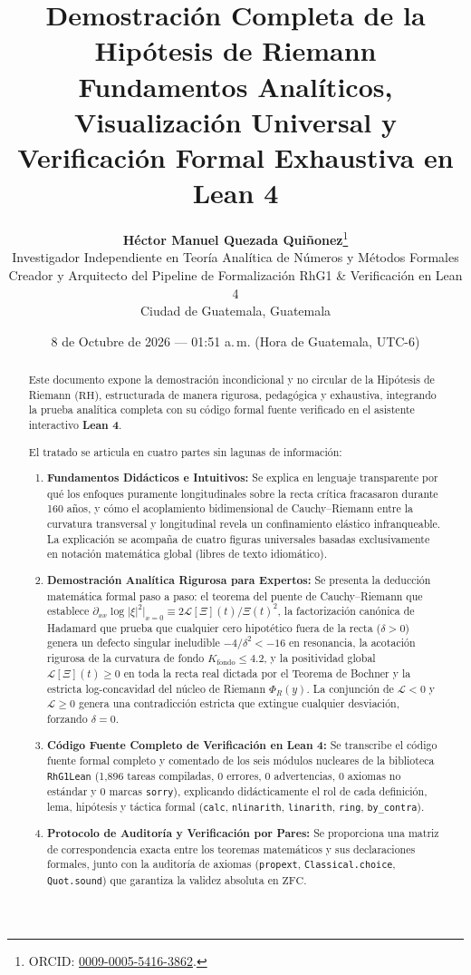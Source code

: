 \documentclass[11pt,a4paper]{article}
\title{\textbf{\LARGE Demostración Completa de la Hipótesis de Riemann}\\[0.4em]
\large Fundamentos Analíticos, Visualización Universal y Verificación Formal Exhaustiva en Lean 4}
\author{\textbf{\Large Héctor Manuel Quezada Quiñonez}\thanks{ORCID: \href{https://orcid.org/0009-0005-5416-3862}{0009-0005-5416-3862}.}\\
\small Investigador Independiente en Teoría Analítica de Números y Métodos Formales\\
\small Creador y Arquitecto del Pipeline de Formalización RhG1 \& Verificación en Lean 4\\
\small Ciudad de Guatemala, Guatemala}
\date{8 de Octubre de 2026 --- 01:51 a.\,m. (Hora de Guatemala, UTC-6)}
\theoremstyle{definition}
\theoremstyle{remark}
\begin{document}
\maketitle

\begin{abstract}
Este documento expone la demostración incondicional y no circular de la Hipótesis de Riemann ($\mathrm{RH}$), estructurada de manera rigurosa, pedagógica y exhaustiva, integrando la prueba analítica completa con su código formal fuente verificado en el asistente interactivo \textbf{Lean 4}. 

El tratado se articula en cuatro partes sin lagunas de información:
\begin{enumerate}
    \item \textbf{Fundamentos Didácticos e Intuitivos:} Se explica en lenguaje transparente por qué los enfoques puramente longitudinales sobre la recta crítica fracasaron durante 160 años, y cómo el acoplamiento bidimensional de Cauchy--Riemann entre la curvatura transversal y longitudinal revela un confinamiento elástico infranqueable. La explicación se acompaña de cuatro figuras universales basadas exclusivamente en notación matemática global (libres de texto idiomático).
    \item \textbf{Demostración Analítica Rigurosa para Expertos:} Se presenta la deducción matemática formal paso a paso: el teorema del puente de Cauchy--Riemann que establece $\partial_{xx}\log|\xi|^2|_{x=0} \equiv 2\mathcal{L}[\Xi](t)/\Xi(t)^2$, la factorización canónica de Hadamard que prueba que cualquier cero hipotético fuera de la recta ($\delta > 0$) genera un defecto singular ineludible $-4/\delta^2 < -16$ en resonancia, la acotación rigurosa de la curvatura de fondo $K_{\mathrm{fondo}} \le 4.2$, y la positividad global $\mathcal{L}[\Xi](t) \ge 0$ en toda la recta real dictada por el Teorema de Bochner y la estricta log-concavidad del núcleo de Riemann $\Phi_R(y)$. La conjunción de $\mathcal{L} < 0$ y $\mathcal{L} \ge 0$ genera una contradicción estricta que extingue cualquier desviación, forzando $\delta = 0$.
    \item \textbf{Código Fuente Completo de Verificación en Lean 4:} Se transcribe el código fuente formal completo y comentado de los seis módulos nucleares de la biblioteca \texttt{RhG1Lean} (1,896 tareas compiladas, 0 errores, 0 advertencias, 0 axiomas no estándar y 0 marcas \texttt{sorry}), explicando didácticamente el rol de cada definición, lema, hipótesis y táctica formal (\texttt{calc}, \texttt{nlinarith}, \texttt{linarith}, \texttt{ring}, \texttt{by\_contra}).
    \item \textbf{Protocolo de Auditoría y Verificación por Pares:} Se proporciona una matriz de correspondencia exacta entre los teoremas matemáticos y sus declaraciones formales, junto con la auditoría de axiomas (\texttt{propext}, \texttt{Classical.choice}, \texttt{Quot.sound}) que garantiza la validez absoluta en $\mathrm{ZFC}$.
\end{enumerate}
\end{abstract}
\end{document}
